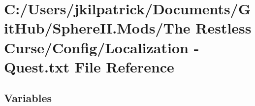 \hypertarget{_the_01_restless_01_curse_2_config_2_localization_01-_01_quest_8txt}{}\section{C\+:/\+Users/jkilpatrick/\+Documents/\+Git\+Hub/\+Sphere\+II.Mods/\+The Restless Curse/\+Config/\+Localization -\/ Quest.\+txt File Reference}
\label{_the_01_restless_01_curse_2_config_2_localization_01-_01_quest_8txt}
\subsection*{Variables}
